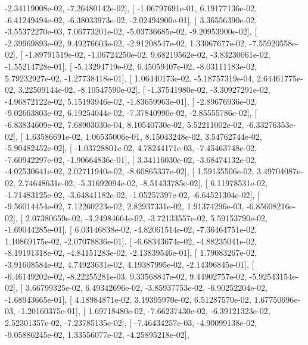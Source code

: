 \documentclass{article}
\begin{document}
         -2.34119008e-02,  -7.26480142e-02],
       [ -1.06797691e-01,   6.19177136e-02,  -6.41249494e-02,
         -6.38033973e-02,  -2.02494900e-01],
       [  3.36556390e-02,  -3.55372270e-03,   7.06773201e-02,
         -5.03736685e-02,  -9.20953900e-02],
       [ -2.39969893e-02,   9.49276603e-02,  -2.91208547e-02,
          1.33067677e-02,  -7.55920558e-02],
       [ -1.89791519e-02,  -1.06724250e-02,   9.68219562e-02,
         -3.83230061e-02,  -1.55214728e-01],
       [ -5.13294719e-02,   6.45059407e-02,  -8.03111183e-02,
          5.79232927e-02,  -1.27738418e-01],
       [  1.06440173e-02,  -5.18757319e-04,   2.64461775e-02,
          3.22509144e-02,  -8.10547590e-02],
       [ -1.37541980e-02,  -3.30927291e-02,  -4.96872122e-02,
          5.15193946e-02,  -1.83659963e-01],
       [ -2.89676936e-02,  -9.02663803e-02,   6.19254044e-02,
         -7.37840990e-02,  -2.85555786e-02],
       [ -6.83834609e-02,   7.68903030e-04,   8.10540730e-02,
          5.52211002e-02,  -6.33276353e-02],
       [  1.63586691e-02,   1.06535006e-01,   8.15043248e-02,
          3.54762744e-02,  -5.90482452e-02],
       [ -1.03728801e-02,   4.78244171e-03,  -7.45463748e-02,
         -7.60942297e-02,  -1.90664836e-01],
       [  3.34116030e-02,  -3.68474132e-02,  -4.02530641e-02,
          2.02711940e-02,  -8.60865337e-02],
       [  1.59135506e-02,   3.49704087e-02,   2.74648631e-02,
         -5.31692094e-02,  -8.51433785e-02],
       [  6.11978531e-02,  -1.71483125e-02,  -3.64841182e-02,
         -1.05257397e-02,  -6.64521304e-02],
       [ -9.56014454e-02,   7.12260223e-02,   2.82937331e-02,
          1.91374296e-03,  -6.85608216e-02],
       [  2.07380659e-02,  -3.24984664e-02,  -3.72133557e-02,
          5.59153790e-02,  -1.69044285e-01],
       [  6.03146838e-02,  -4.82061514e-02,  -7.36464751e-02,
          1.10869175e-02,  -2.07078836e-01],
       [ -6.68343674e-02,  -4.88235041e-02,  -8.19191318e-02,
         -4.84151283e-02,  -2.13839546e-01],
       [  1.79083267e-02,  -3.91608584e-02,   4.74923631e-02,
          4.19387995e-02,  -2.14396845e-01],
       [ -6.46149202e-02,  -8.22255281e-03,   9.33568847e-02,
          9.44902757e-02,  -5.92543154e-02],
       [  3.66799325e-02,   6.49342696e-02,  -3.85937753e-02,
         -6.90252204e-02,  -1.68943665e-01],
       [  4.18984871e-02,   3.19395970e-02,   6.51287570e-02,
          1.67750696e-03,  -1.20160375e-01],
       [  1.69718480e-02,  -7.66237430e-02,  -6.39121323e-02,
          2.52301357e-02,  -7.23785135e-02],
       [ -7.46434257e-03,  -4.90099138e-02,  -9.05886245e-02,
          1.33556077e-02,  -4.25895218e-02],
\end{document}
